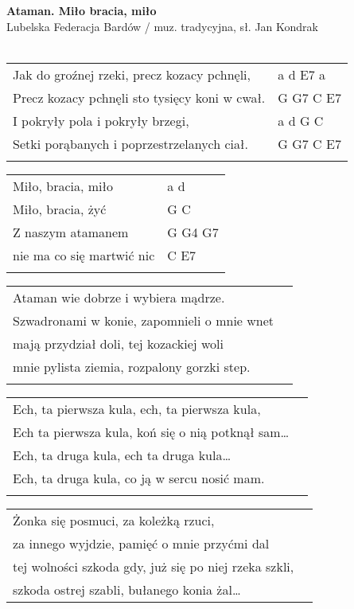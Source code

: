 \documentclass[a5paper]{article}
\begin{document}


\noindent
\fontsize{12pt}{15pt}\selectfont
\textbf{Ataman. Miło bracia, miło} \\
\fontsize{8pt}{10pt}\selectfont
Lubelska Federacja Bardów / muz. tradycyjna, sł. Jan Kondrak \\ \\
\fontsize{10pt}{12pt}\selectfont
{}
\begin{tabular}{@{}p{9cm}p{3cm}@{}}
\noindent
Jak do groźnej rzeki, precz kozacy pchnęli, & a d E7 a \\
Precz kozacy pchnęli sto tysięcy koni w cwał. & G G7 C E7 \\
I pokryły pola i pokryły brzegi, & a d G C \\
Setki porąbanych i poprzestrzelanych ciał. & G G7 C E7 \\ \\
\end{tabular}

\noindent
\begin{tabular}{@{}p{7cm}p{3cm}@{}}
Miło, bracia, miło & a d \\
Miło, bracia, żyć & G C \\
Z naszym atamanem & G G4 G7 \\
nie ma co się martwić nic & C E7 \\ \\
\end{tabular}

\noindent
\begin{tabular}{@{}p{8.5cm}p{3cm}@{}}
Ataman wie dobrze i wybiera mądrze.\\
Szwadronami w konie, zapomnieli o mnie wnet\\
mają przydział doli, tej kozackiej woli\\
mnie pylista ziemia, rozpalony gorzki step.\\\\
\end{tabular}

\noindent
\begin{tabular}{@{}p{8.5cm}p{3cm}@{}}
Ech, ta pierwsza kula, ech, ta pierwsza kula,\\
Ech  ta pierwsza kula, koń się o nią potknął sam… \\
Ech, ta druga kula, ech ta druga kula… \\
Ech, ta druga kula, co ją w sercu nosić mam. \\ \\
\end{tabular}

\noindent
\begin{tabular}{@{}p{8.5cm}p{3cm}@{}}
Żonka się posmuci, za koleżką rzuci,\\
za innego wyjdzie, pamięć o mnie przyćmi dal\\
tej wolności szkoda gdy, już się po niej rzeka szkli,\\
szkoda ostrej szabli, bułanego konia żal…
\end{tabular}
\end{document}
